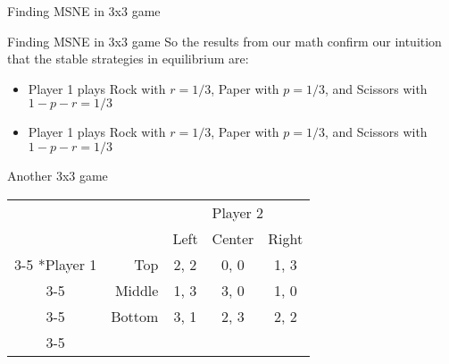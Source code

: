 
\begin{frame}{Finding MSNE in 3x3 game}
  \begin{minipage}{0.45\textwidth}
  \begin{center}
  \end{center}
  \end{minipage} 
  \begin{minipage}{0.45\textwidth}
  \begin{center}
  \end{center}
  \end{minipage} 
\end{frame}


\begin{frame}{Finding MSNE in 3x3 game}
  So the results from our math confirm our intuition that the stable strategies in equilibrium are:
  \begin{itemize}
    \item Player 1 plays Rock with $r=1/3$, Paper with $p=1/3$, and Scissors with
    $1-p-r=1/3$
    \item Player 1 plays Rock with $r=1/3$, Paper with $p=1/3$, and Scissors with
    $1-p-r=1/3$
  \end{itemize}
\end{frame}


\begin{frame}{Another 3x3 game}
 \begin{table}[h]
\centering
  \begin{tabular}{cr|c|c|c|}
	& \multicolumn{1}{c}{} & \multicolumn{3}{c}{Player 2}\\
    & \multicolumn{1}{c}{}            &  Left  & Center & Right  \\\cline{3-5}
    \multirow{3}*{Player 1}  & Top    &  2,  2 &  0,  0 &  1,  3 \\\cline{3-5}
                             & Middle &  1,  3 &  3,  0 &  1,  0 \\\cline{3-5}
                             & Bottom &  3,  1 &  2,  3 &  2,  2 \\\cline{3-5}
\end{tabular}
\end{table}
\end{frame}

